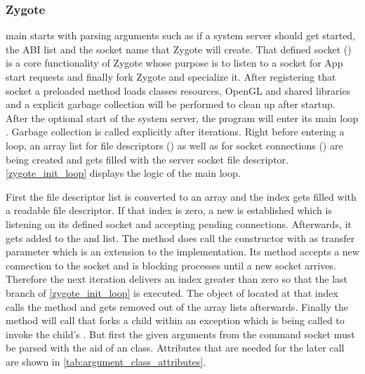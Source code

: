 \subsubsection{Zygote}\label{section:zygote}
 main starts with parsing arguments such as if a system
server should get started, the ABI list and the socket name that Zygote will
create. That defined socket () is a core functionality of Zygote whose purpose
is to listen to a socket for App start requests and finally fork Zygote and specialize it. After registering that socket a preloaded method loads classes
resources, OpenGL and shared libraries and a explicit garbage collection
 will be performed to clean up after startup. After the optional start of the system server, the program will enter its main loop
. Garbage collection is called explicitly
after  iterations. Right before entering a loop, an array list for file descriptors () as well as for socket connections () are being
created and  gets filled with the server socket file descriptor.
\autoref{zygote_init_loop} displays the logic of the main loop.



First the file descriptor list is converted to an array and the index gets
filled with a readable file descriptor. If that index is zero,
a new  is established which is listening
on its defined socket and accepting pending connections.
Afterwards, it gets added to the 
and  list.
The  method does
call the  constructor with 
as transfer parameter which is an extension to the 
implementation. Its  method accepts a new connection
to the socket and is blocking processes until a new socket arrives.
Therefore the next iteration delivers an index greater than zero so that
the last  branch of \autoref{zygote_init_loop} is executed.
The  object of  located at that index calls
the  method and gets removed out of the array lists afterwards.
Finally the  method will call 
that forks a child within an exception which is being called to invoke the child's .
But first the given arguments from the command socket must be parsed with the
aid of an  class. Attributes that are needed for the later  call are shown in \autoref{tab:argument_class_attributes}.

